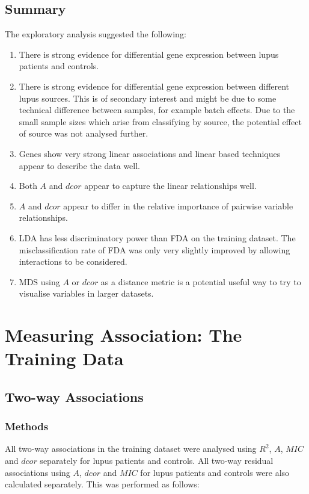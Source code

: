 \documentclass[a4paper, 12pt]{report}
\begin{document}
\section{Summary}
The exploratory analysis suggested the following: 

\begin{enumerate}
\item There is strong evidence for differential gene expression between lupus patients and controls.
\item There is strong evidence for differential gene expression between different lupus sources. This is of secondary interest and might be due to some technical difference between samples, for example batch effects. Due to the small sample sizes which arise from classifying by source, the potential effect of source was not analysed further.

\item Genes show very strong linear associations and linear based techniques appear to describe the data well.
\item Both $A$ and $dcor$ appear to capture the linear relationships well.
\item $A$ and $dcor$ appear to differ in the relative importance of pairwise variable relationships.
\item LDA has less discriminatory power than FDA on the training dataset. The misclassification rate of FDA was only very slightly improved by allowing interactions to be considered.
\item MDS using $A$ or $dcor$ as a distance metric is a potential useful way to try to visualise variables in larger datasets.
\end{enumerate}



\chapter{Measuring Association: The Training Data}

\section{Two-way Associations}

\subsection*{Methods}
All two-way associations in the training dataset were analysed using $R^2$, $A$, $MIC$ and $dcor$ separately for lupus patients and controls. All two-way residual associations using $A$, $dcor$ and $MIC$ for lupus patients and controls were also calculated separately. This was performed as follows:
\end{document}
